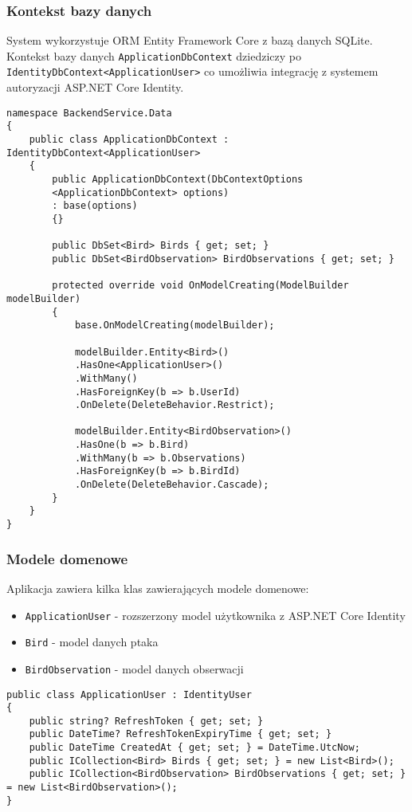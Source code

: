 \subsubsection{Kontekst bazy danych}
System wykorzystuje ORM Entity Framework Core z bazą danych SQLite. Kontekst bazy danych \texttt{ApplicationDbContext} dziedziczy po \texttt{IdentityDbContext<ApplicationUser>} co umożliwia integrację z systemem autoryzacji ASP.NET Core Identity.

\begin{lstlisting}[style=csharp, caption={Implementacja ApplicationDbContext}]
namespace BackendService.Data
{
	public class ApplicationDbContext : IdentityDbContext<ApplicationUser>
	{
		public ApplicationDbContext(DbContextOptions
		<ApplicationDbContext> options)
		: base(options)
		{}
		
		public DbSet<Bird> Birds { get; set; }
		public DbSet<BirdObservation> BirdObservations { get; set; }
		
		protected override void OnModelCreating(ModelBuilder modelBuilder)
		{
			base.OnModelCreating(modelBuilder);
			
			modelBuilder.Entity<Bird>()
			.HasOne<ApplicationUser>()
			.WithMany()
			.HasForeignKey(b => b.UserId)
			.OnDelete(DeleteBehavior.Restrict);
			
			modelBuilder.Entity<BirdObservation>()
			.HasOne(b => b.Bird)
			.WithMany(b => b.Observations)
			.HasForeignKey(b => b.BirdId)
			.OnDelete(DeleteBehavior.Cascade);
		}
	}
}
\end{lstlisting}

\subsubsection{Modele domenowe}
Aplikacja zawiera kilka klas zawierających modele domenowe:
\begin{itemize}
	\item \texttt{ApplicationUser} - rozszerzony model użytkownika z ASP.NET Core Identity
	\item \texttt{Bird} - model danych ptaka
	\item \texttt{BirdObservation} - model danych obserwacji
\end{itemize}

\begin{lstlisting}[style=csharp, caption={Implementacja ApplicationUser}]
public class ApplicationUser : IdentityUser
{
	public string? RefreshToken { get; set; }
	public DateTime? RefreshTokenExpiryTime { get; set; }
	public DateTime CreatedAt { get; set; } = DateTime.UtcNow;
	public ICollection<Bird> Birds { get; set; } = new List<Bird>();
	public ICollection<BirdObservation> BirdObservations { get; set; } = new List<BirdObservation>();
}
\end{lstlisting}

